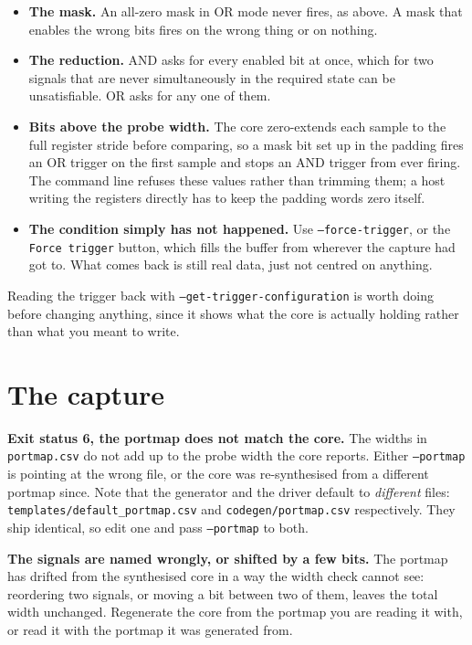 \documentclass[../manual.tex]{subfiles}
\begin{document}
\begin{itemize}
    \item \textbf{The mask.} An all-zero mask in OR mode never fires, as above. A mask that enables the wrong bits fires on the wrong thing or on nothing.
    \item \textbf{The reduction.} AND asks for every enabled bit at once, which for two signals that are never simultaneously in the required state can be unsatisfiable. OR asks for any one of them.
    \item \textbf{Bits above the probe width.} The core zero-extends each sample to the full register stride before comparing, so a mask bit set up in the padding fires an OR trigger on the first sample and stops an AND trigger from ever firing. The command line refuses these values rather than trimming them; a host writing the registers directly has to keep the padding words zero itself.
    \item \textbf{The condition simply has not happened.} Use \texttt{--force-trigger}, or the \texttt{Force trigger} button, which fills the buffer from wherever the capture had got to. What comes back is still real data, just not centred on anything.
\end{itemize}

Reading the trigger back with \texttt{--get-trigger-configuration} is worth doing before changing anything, since it shows what the core is actually holding rather than what you meant to write.

\section{The capture}
\label{sec:tr_capture}

\textbf{Exit status 6, the portmap does not match the core.} The widths in \texttt{portmap.csv} do not add up to the probe width the core reports. Either \texttt{--portmap} is pointing at the wrong file, or the core was re-synthesised from a different portmap since. Note that the generator and the driver default to \emph{different} files: \texttt{templates/default\_portmap.csv} and \texttt{codegen/portmap.csv} respectively. They ship identical, so edit one and pass \texttt{--portmap} to both.

\textbf{The signals are named wrongly, or shifted by a few bits.} The portmap has drifted from the synthesised core in a way the width check cannot see: reordering two signals, or moving a bit between two of them, leaves the total width unchanged. Regenerate the core from the portmap you are reading it with, or read it with the portmap it was generated from.
\end{document}

